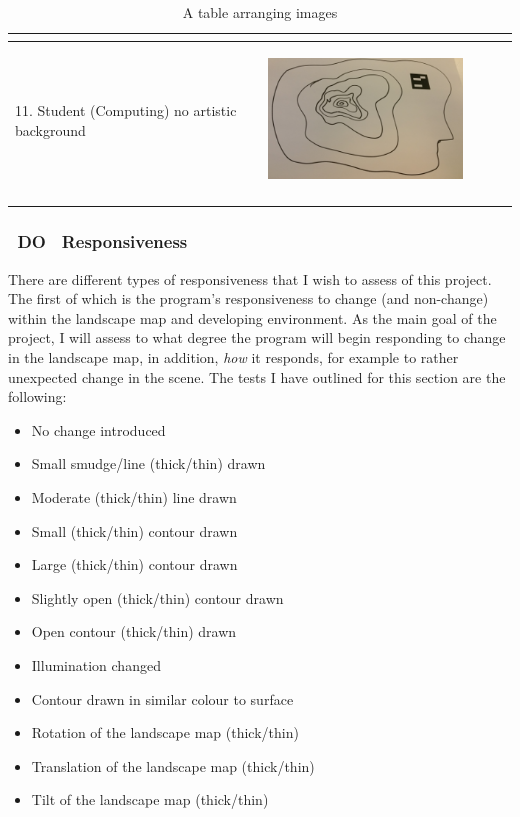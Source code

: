 \documentclass[11pt]{article}
\begin{document}
\begin{landscape}
\begin{longtable}{p{}| p{}| p{} | p{} |p{}}
							& \begin{center}\end{center} & \\
\hline
11. Student (Computing)
	no artistic background & \begin{center}\includegraphics[scale=0.5]{pics/usertesting/11.png}\end{center} 
							& \begin{center}\end{center} & \\
\hline
\caption{A table arranging  images}
\label{tab:gt}
\end{longtable}
\end{landscape}
\newpage

\subsubsection{~DO~ Responsiveness}
There are different types of responsiveness that I wish to assess of this 
project. The first of which is the program's responsiveness to change (and
non-change) within the landscape map and developing environment. As the
main goal of the project, I will assess to what degree the program will
begin responding to change in the landscape map, in addition, 
\textit{how} it responds, for example to rather unexpected change in the
scene. The tests I have outlined for this section are the following:
\begin{itemize}
	\item No change introduced
	\item Small smudge/line (thick/thin) drawn
	\item Moderate (thick/thin) line drawn 
	\item Small (thick/thin) contour drawn
	\item Large (thick/thin) contour drawn
	\item Slightly open (thick/thin) contour drawn
	\item Open contour (thick/thin) drawn
	\item Illumination changed
	\item Contour drawn in similar colour to surface
	\item Rotation of the landscape map (thick/thin) 
	\item Translation of the landscape map (thick/thin) 
	\item Tilt of the landscape map (thick/thin) 
\end{itemize}
\end{document}
